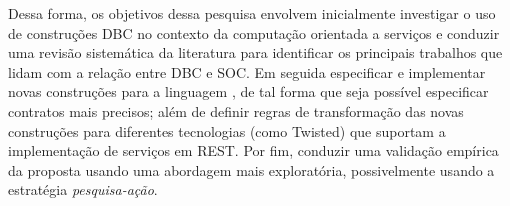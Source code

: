 Dessa forma, os objetivos dessa pesquisa envolvem inicialmente investigar o uso
de construções DBC no contexto da computação orientada a serviços e conduzir uma
revisão sistemática da literatura para identificar os principais trabalhos que
lidam com a relação entre DBC e SOC. Em seguida especificar e implementar novas
construções para a linguagem \neoidl, de tal forma que seja possível especificar
contratos mais precisos; além de definir regras de transformação das novas
construções \neoidl{} para diferentes tecnologias (como Twisted) que suportam a
implementação de serviços em REST.
Por fim, conduzir uma validação empírica da proposta usando uma abordagem mais
exploratória, possivelmente usando a estratégia \emph{pesquisa-ação}.


